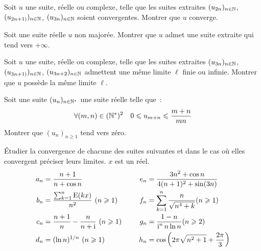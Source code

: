 \begin{exercice}
    Soit \(u\) une suite, réelle ou complexe, telle que les suites extraites \((u_{2n})_{n \in \mathbb{N}}\), \((u_{2n+1)})_{n \in \mathbb{N}}\), \((u_{3n})_{n \in \mathbb{N}}\) soient convergentes. Montrer que \(u\) converge.
\end{exercice}
\begin{exercice}
    Soit une suite réelle \(u\) non majorée. Montrer que \(u\) admet une suite extraite qui tend vers \(+\infty\).
\end{exercice}
\begin{exercice}
    Soit \(u\) une suite, réelle ou complexe, telle que les suites extraites \((u_{3n})_{n \in \mathbb{N}}\), \((u_{3n+1)})_{n \in \mathbb{N}}\), \((u_{3n+2})_{n \in \mathbb{N}}\) admettent une même limite \(\ell\) finie ou infinie. Montrer que \(u\) possède la même limite \(\ell\).
\end{exercice}
\begin{exercice}
    Soit une suite \((u_n)_{n \in \mathbb{N}^*}\) une suite réelle telle que~:
    \[\forall (m,n) \in (\mathbb{N}^*)^2 \quad 0 \leqslant u_{m+n} \leqslant \frac{m+n}{mn}\]
    Montrer que \((u_n)_{n\geqslant 1}\) tend vers zéro.
\end{exercice}
\begin{exercice}
    Étudier la convergence de chacune des suites suivantes et dans le cas où elles convergent préciser leurs limites. \(x\) est un réel.
    \begin{align*}
        a_n &= \frac{n+1}{n+\cos n} \qquad & e_n & = \frac{3n^2+\cos n}{4(n+1)^2+\sin(3n)} \\
        b_n &= \frac{\sum_{k = 1}^n \operatorname{E}(kx)}{n^2} \ (n \geqslant 1) \qquad & f_n &= \sum_{k = 1}^n \frac{n}{\sqrt{n^4+k}} (n \geqslant 1) \\
        c_n &= \frac{n+1}{n} - \frac{n}{n+\operatorname{i}} \ (n \geqslant 1) \quad & g_n &= \frac{1-n}{\operatorname{i}^n n \ln n} (n\geqslant 2) \\
        d_n &= (\ln n)^{1/n} \ (n \geqslant 1) \quad & h_n &= \cos\left(2\pi\sqrt{n^2+1}+\frac{2\pi}{3}\right)
    \end{align*}
\end{exercice}

